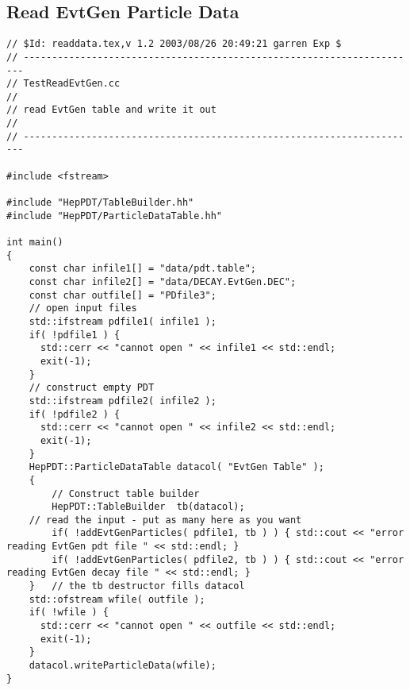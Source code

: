 \subsection { Read EvtGen Particle Data }
\begin{verbatim}
// $Id: readdata.tex,v 1.2 2003/08/26 20:49:21 garren Exp $
// ----------------------------------------------------------------------
// TestReadEvtGen.cc
//
// read EvtGen table and write it out
//
// ----------------------------------------------------------------------

#include <fstream>

#include "HepPDT/TableBuilder.hh"
#include "HepPDT/ParticleDataTable.hh"

int main()
{
    const char infile1[] = "data/pdt.table";
    const char infile2[] = "data/DECAY.EvtGen.DEC";
    const char outfile[] = "PDfile3";
    // open input files
    std::ifstream pdfile1( infile1 );
    if( !pdfile1 ) { 
      std::cerr << "cannot open " << infile1 << std::endl;
      exit(-1);
    }
    // construct empty PDT
    std::ifstream pdfile2( infile2 );
    if( !pdfile2 ) { 
      std::cerr << "cannot open " << infile2 << std::endl;
      exit(-1);
    }
    HepPDT::ParticleDataTable datacol( "EvtGen Table" );
    {
        // Construct table builder
        HepPDT::TableBuilder  tb(datacol);
	// read the input - put as many here as you want
        if( !addEvtGenParticles( pdfile1, tb ) ) { std::cout << "error reading EvtGen pdt file " << std::endl; }
        if( !addEvtGenParticles( pdfile2, tb ) ) { std::cout << "error reading EvtGen decay file " << std::endl; }
    }	// the tb destructor fills datacol
    std::ofstream wfile( outfile );
    if( !wfile ) { 
      std::cerr << "cannot open " << outfile << std::endl;
      exit(-1);
    }
    datacol.writeParticleData(wfile);
}
\end{verbatim}

